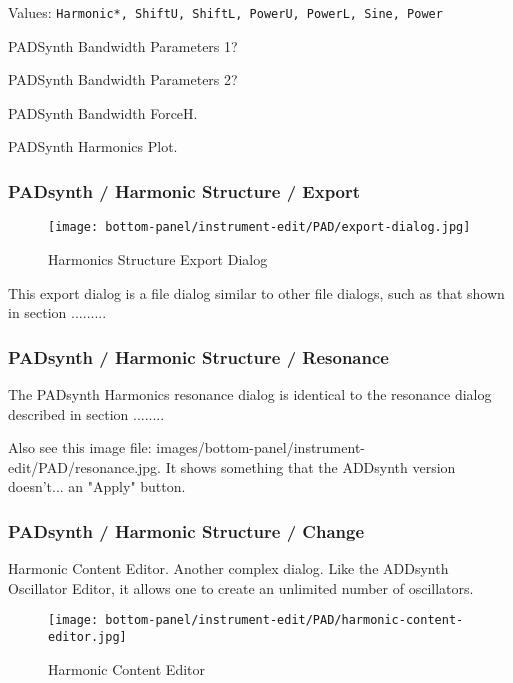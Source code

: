    Values: \texttt{Harmonic*, ShiftU, ShiftL, PowerU, PowerL, Sine, Power}

   PADSynth Bandwidth Parameters 1?

   PADSynth Bandwidth Parameters 2?

   PADSynth Bandwidth ForceH.

   PADSynth Harmonics Plot.

\subsubsection{PADsynth / Harmonic Structure / Export}
\label{subsubsec:padsynth_harmonic_structure_export}

\begin{figure}[H]
   \centering 
   \texttt{[image: bottom-panel/instrument-edit/PAD/export-dialog.jpg]}
   \caption{Harmonics Structure Export Dialog}
   \label{fig:harmonics_structure_export_dialog}
\end{figure}

   This export dialog is a file dialog similar to other file dialogs, such as
   that shown in section .........

\subsubsection{PADsynth / Harmonic Structure / Resonance}
\label{subsubsec:padsynth_harmonic_structure_resonance}

   The PADsynth Harmonics resonance dialog is identical to the resonance
   dialog described in section ........

   Also see this image file:
   images/bottom-panel/instrument-edit/PAD/resonance.jpg.
   It shows something that the ADDsynth version doesn't... an "Apply"
   button.

\subsubsection{PADsynth / Harmonic Structure / Change}
\label{subsubsec:padsynth_harmonic_structure_change}

   Harmonic Content Editor.  Another complex dialog.
   Like the ADDsynth Oscillator Editor, it allows one to create an unlimited
   number of oscillators. 

\begin{figure}[H]
   \centering 
   \texttt{[image: bottom-panel/instrument-edit/PAD/harmonic-content-editor.jpg]}
   \caption{Harmonic Content Editor}
   \label{fig:padsynth_harmonic_content_editor}
\end{figure}

